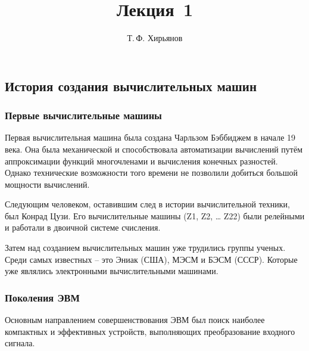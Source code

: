 \documentclass[a4paper, fleqn]{article}
\title{Лекция \textnumero\,1}
\author{Т.\,Ф. Хирьянов}
\date{}
\begin{document}
	\maketitle
	\subsection*{История создания вычислительных машин}
	
	\subsubsection*{Первые вычислительные машины}
		Первая вычислительная машина была создана  Чарльзом Бэббиджем в начале 19 века. Она была механической и способствовала автоматизации вычислений путём аппроксимации функций многочленами и вычисления конечных разностей. Однако технические возможности того времени не позволили добиться большой мощности вычислений.
		
		Следующим человеком, оставившим след в истории вычислительной техники, был Конрад Цузи. Его вычислительные машины (Z1, Z2, … Z22) были релейными и работали в двоичной системе счисления. 
		
		Затем над созданием вычислительных машин уже трудились группы ученых. Среди самых известных – это Эниак (США), МЭСМ и БЭСМ (СССР). Которые уже являлись электронными вычислительными машинами.
		
	\subsubsection*{Поколения ЭВМ}
	
		Основным направлением совершенствования ЭВМ был поиск наиболее компактных и эффективных устройств, выполняющих преобразование входного сигнала.
			
\end{document}

